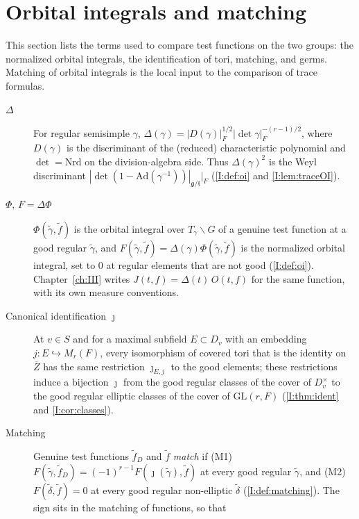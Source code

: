 \section{Orbital integrals and matching}\label{gl:matching}
This section lists the terms used to compare test functions on the two groups: the normalized orbital integrals, the identification of tori, matching, and germs. Matching of orbital integrals is the local input to the comparison of trace formulas.

\begin{description}
\item[$\Delta$] For regular semisimple $\gamma$,
$\Delta(\gamma)=|D(\gamma)|_F^{1/2}|\det\gamma|_F^{-(r-1)/2}$, where
$D(\gamma)$ is the discriminant of the (reduced) characteristic
polynomial and $\det=\mathrm{Nrd}$ on the division-algebra side.
Thus $\Delta(\gamma)^2$ is the Weyl discriminant
$|\det(1-\mathrm{Ad}(\gamma^{-1}))|_{\mathfrak g/\mathfrak t}|_F$
(\cref{I:def:oi} and \cref{I:lem:traceOI}).
\item[$\Phi$, $F=\Delta\Phi$] $\Phi(\tilde\gamma,\tilde f)$ is the
orbital integral over $T_\gamma\backslash G$ of a genuine test
function at a good regular $\tilde\gamma$, and
$F(\tilde\gamma,\tilde f)=\Delta(\gamma)\Phi(\tilde\gamma,\tilde f)$
is the normalized orbital integral, set to $0$ at regular elements
that are not good (\cref{I:def:oi}).  Chapter~\ref{ch:III} writes
$J(t,f)=\Delta(t)\,O(t,f)$ for the same function, with its own
measure conventions.
\item[Canonical identification $\jmath$] At $v\in S$ and for a maximal
subfield $E\subset D_v$ with an embedding $j:E\hookrightarrow
M_r(F)$, every isomorphism of covered tori that is the identity on
$\overline Z$ has the same restriction $\jmath_{E,j}$ to the good
elements; these restrictions induce a bijection $\jmath$ from the good
regular classes of the cover of $D_v^\times$ to the good regular
elliptic classes of the cover of $\mathrm{GL}(r,F)$ (\cref{I:thm:ident} and \cref{I:cor:classes}).
\item[Matching] Genuine test functions $\tilde f_D$ and $\tilde f$
\emph{match} if (M1)
$F(\tilde\gamma,\tilde f_D)=(-1)^{r-1}F(\jmath(\tilde\gamma),\tilde f)$
at every good regular $\tilde\gamma$, and (M2) $F(\tilde\delta,\tilde
f)=0$ at every good regular non-elliptic $\tilde\delta$ (\cref{I:def:matching}).  The sign sits in the matching of functions, so that

\end{description}
